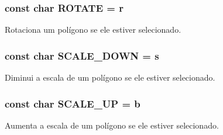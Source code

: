 \subsubsection[{R\+O\+T\+A\+T\+E}]{\setlength{\rightskip}{0pt plus 5cm}const char R\+O\+T\+A\+T\+E = \textquotesingle{}r\textquotesingle{}}\label{group___keyboard_map_ga220657e3f7ae7c0030a20f5784a81432}
Rotaciona um polígono se ele estiver selecionado. \hypertarget{group___keyboard_map_ga1c9377daff9f5f13e998137e70ea7d05}{}
\subsubsection[{S\+C\+A\+L\+E\+\_\+\+D\+O\+W\+N}]{\setlength{\rightskip}{0pt plus 5cm}const char S\+C\+A\+L\+E\+\_\+\+D\+O\+W\+N = \textquotesingle{}s\textquotesingle{}}\label{group___keyboard_map_ga1c9377daff9f5f13e998137e70ea7d05}
Diminui a escala de um polígono se ele estiver selecionado. \hypertarget{group___keyboard_map_ga57f6445073d04904d4a3315db885270c}{}
\subsubsection[{S\+C\+A\+L\+E\+\_\+\+U\+P}]{\setlength{\rightskip}{0pt plus 5cm}const char S\+C\+A\+L\+E\+\_\+\+U\+P = \textquotesingle{}b\textquotesingle{}}\label{group___keyboard_map_ga57f6445073d04904d4a3315db885270c}
Aumenta a escala de um polígono se ele estiver selecionado. 
